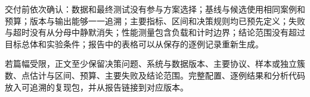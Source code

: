 \documentclass[../textbook.tex]{subfiles}
\begin{document}
交付前依次确认：数据和最终测试没有参与方案选择；基线与候选使用相同案例和预算；版本与输出能够一一追溯；主要指标、区间和决策规则均已预先定义；失败与超时没有从分母中静默消失；性能测量包含负载和计时边界；结论范围没有超过目标总体和实验条件；报告中的表格可以从保存的逐例记录重新生成。

\begin{note}[最小充分报告]
若篇幅受限，正文至少保留决策问题、系统与数据版本、主要协议、样本或独立簇数、点估计与区间、预算、主要失败及结论范围。完整配置、逐例结果和分析代码放入可追溯的复现包，并从报告链接到对应版本。
\end{note}

\chapterreferences
\myendchapterdocument
\end{document}

